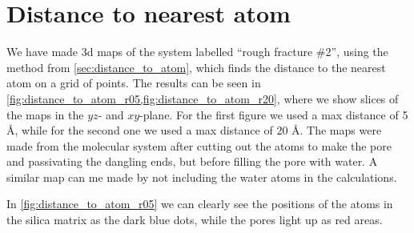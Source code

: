 \section{Distance to nearest atom}

We have made 3d maps of the system labelled ``rough fracture \#2'', using the method from \cref{sec:distance_to_atom}, which finds the distance to the nearest atom on a grid of points. The results can be seen in \cref{fig:distance_to_atom_r05,fig:distance_to_atom_r20}, where we show slices of the maps in the $yz$- and $xy$-plane. For the first figure we used a max distance of 5 \AA, while for the second one we used a max distance of 20 \AA. The maps were made from the molecular system after cutting out the atoms to make the pore and passivating the dangling ends, but before filling the pore with water. A similar map can me made by not including the water atoms in the calculations.

In \cref{fig:distance_to_atom_r05} we can clearly see the positions of the atoms in the silica matrix as the dark blue dots, while the pores light up as red areas.

